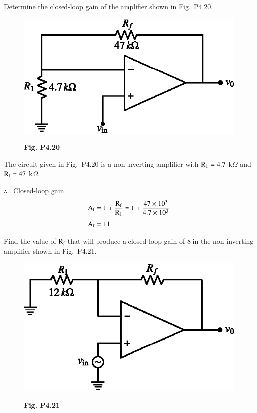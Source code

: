 \begin{problem}\label{prob4.20}
Determine the closed-loop gain of the amplifier shown in Fig.~P4.20.
\begin{figure}[H]
\centering
\includegraphics{chap4/figP4.20.eps}

\smallskip
{\bf Fig. P4.20}
\end{figure}
\end{problem}

\begin{solution}
The circuit given in Fig.~P4.20 is a non-inverting amplifier with $\textrm{R}_{1}=4.7$ k$\Omega$ and $\textrm{R}_{\textrm{f}}=47$ k$\Omega$.

$\therefore$~ Closed-loop gain
\begin{align*}
\textrm{A}_{\textrm{f}} &= 1+\frac{\textrm{R}_{\textrm{f}}}{\textrm{R}_{1}}= 1+\frac{47\times 10^{3}}{4.7\times 10^{3}}\\[3pt]
\textrm{A}_{\textrm{f}} &= 11
\end{align*}
\end{solution}

\begin{problem}\label{prob4.21}
Find the value of $\textrm{R}_{\textrm{f}}$ that will produce a closed-loop gain of 8 in the non-inverting amplifier shown in Fig.~P4.21.
\begin{figure}[H]
\centering
\includegraphics[scale=.95]{chap4/figP4.21.eps}

\smallskip
{\bf Fig. P4.21}
\end{figure}
\end{problem}

